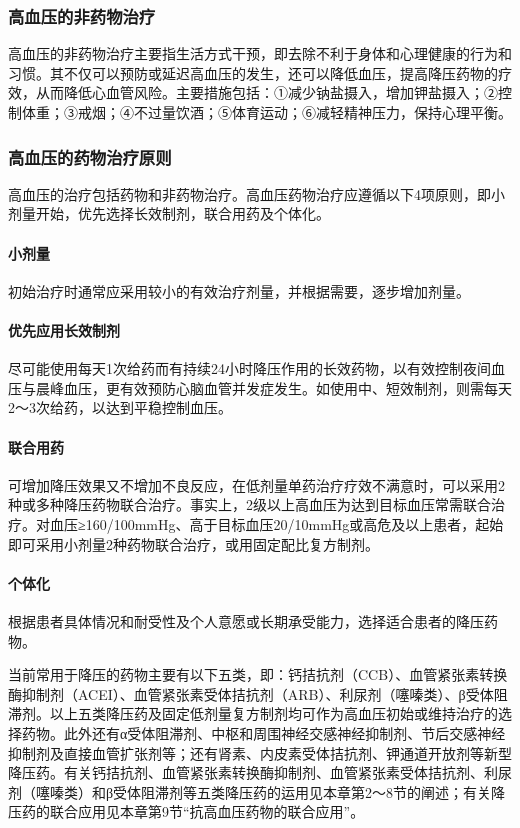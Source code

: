 \subsubsection{高血压的非药物治疗}

高血压的非药物治疗主要指生活方式干预，即去除不利于身体和心理健康的行为和习惯。其不仅可以预防或延迟高血压的发生，还可以降低血压，提高降压药物的疗效，从而降低心血管风险。主要措施包括：①减少钠盐摄入，增加钾盐摄入；②控制体重；③戒烟；④不过量饮酒；⑤体育运动；⑥减轻精神压力，保持心理平衡。

\subsubsection{高血压的药物治疗原则}

高血压的治疗包括药物和非药物治疗。高血压药物治疗应遵循以下4项原则，即小剂量开始，优先选择长效制剂，联合用药及个体化。

\paragraph{小剂量}

初始治疗时通常应采用较小的有效治疗剂量，并根据需要，逐步增加剂量。

\paragraph{优先应用长效制剂}

尽可能使用每天1次给药而有持续24小时降压作用的长效药物，以有效控制夜间血压与晨峰血压，更有效预防心脑血管并发症发生。如使用中、短效制剂，则需每天2～3次给药，以达到平稳控制血压。

\paragraph{联合用药}

可增加降压效果又不增加不良反应，在低剂量单药治疗疗效不满意时，可以采用2种或多种降压药物联合治疗。事实上，2级以上高血压为达到目标血压常需联合治疗。对血压≥160/100mmHg、高于目标血压20/10mmHg或高危及以上患者，起始即可采用小剂量2种药物联合治疗，或用固定配比复方制剂。

\paragraph{个体化}

根据患者具体情况和耐受性及个人意愿或长期承受能力，选择适合患者的降压药物。

当前常用于降压的药物主要有以下五类，即：钙拮抗剂（CCB）、血管紧张素转换酶抑制剂（ACEI）、血管紧张素受体拮抗剂（ARB）、利尿剂（噻嗪类）、β受体阻滞剂。以上五类降压药及固定低剂量复方制剂均可作为高血压初始或维持治疗的选择药物。此外还有α受体阻滞剂、中枢和周围神经交感神经抑制剂、节后交感神经抑制剂及直接血管扩张剂等；还有肾素、内皮素受体拮抗剂、钾通道开放剂等新型降压药。有关钙拮抗剂、血管紧张素转换酶抑制剂、血管紧张素受体拮抗剂、利尿剂（噻嗪类）和β受体阻滞剂等五类降压药的运用见本章第2～8节的阐述；有关降压药的联合应用见本章第9节“抗高血压药物的联合应用”。

